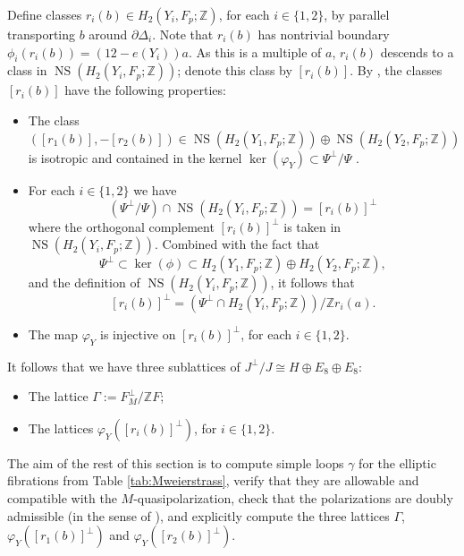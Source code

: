 \documentclass[a4paper]{amsart}
\theoremstyle{definition}
\theoremstyle{plain}
\theoremstyle{remark}
\newcommand{\bZ}{\mathbb{Z}}
\DeclareMathOperator{\NS}{NS}
\numberwithin{figure}{section}
\numberwithin{table}{section}
\begin{document}
Define classes $r_i(b) \in H_2(Y_i,F_p;\bZ)$, for each $i \in \{1,2\}$, by parallel transporting $b$ around $\partial \Delta_i$. Note that $r_i(b)$ has nontrivial boundary $\phi_i(r_i(b)) = (12 - e(Y_i))a$. As this is a multiple of $a$, $r_i(b)$ descends to a class in $\NS(H_2(Y_i,F_p;\bZ))$; denote this class by $[r_i(b)]$. By \cite[Lemmas 2.32 , 2.33, and Section 4.3]{dfk3slpms}, the classes $[r_i(b)]$ have the following properties:
\begin{itemize}
\item The class $([r_1(b)], -[r_2(b)]) \in  \NS(H_2(Y_1,F_p;\bZ)) \oplus \NS(H_2(Y_2,F_p;\bZ))$ is iso\-tropic and contained in the kernel $\ker(\varphi_Y) \subset \Psi^{\perp}/\Psi$ .
\item For each $i \in \{1,2\}$ we have
\[  (\Psi^{\perp}/\Psi) \cap \NS(H_2(Y_i,F_p;\bZ)) = [r_i(b)]^{\perp}\]
where the orthogonal complement $[r_i(b)]^{\perp}$ is taken in $\NS(H_2(Y_i,F_p;\bZ))$. Combined with the fact that
\[\Psi^{\perp} \subset \ker(\phi) \subset H_2(Y_1,F_p;\bZ) \oplus H_2(Y_2,F_p;\bZ),\]
and the definition of $\NS(H_2(Y_i,F_p;\bZ))$, it follows that
\begin{equation} \label{eq:ribperp} [r_i(b)]^{\perp} = (\Psi^{\perp} \cap H_2(Y_i,F_p;\bZ))/\bZ r_i(a).\end{equation}
\item The map $\varphi_Y$ is injective on $[r_i(b)]^{\perp}$, for each $i \in \{1,2\}$.
\end{itemize}

It follows that we have three sublattices of $J^{\perp}/J \cong H \oplus E_8 \oplus E_8$:
\begin{itemize}
\item The lattice $\Gamma := F^{\perp}_{M}/\bZ F$;
\item The lattices $\varphi_Y([r_i(b)]^{\perp})$, for $i \in \{1,2\}$.
\end{itemize}

The aim of the rest of this section is to compute simple loops $\gamma$ for the elliptic fibrations from Table \ref{tab:Mweierstrass}, verify that they are allowable and compatible with the $M$-quasipolarization, check that the polarizations are doubly admissible (in the sense of \cite[Definition 4.29]{dfk3slpms}), and explicitly compute the three lattices $\Gamma$, $\varphi_Y([r_1(b)]^{\perp})$ and $\varphi_Y([r_2(b)]^{\perp})$.
\end{document}
